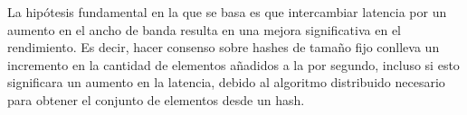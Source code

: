 La hipótesis fundamental en la que se basa \hashchain es que intercambiar latencia por un aumento en el
ancho de banda resulta en una mejora significativa en el rendimiento.
%
Es decir, hacer consenso sobre hashes de tamaño fijo conlleva un incremento en la cantidad de elementos
añadidos a la \setchain por segundo, incluso si esto significara un aumento en la latencia,
debido al algoritmo distribuido necesario para obtener el conjunto de elementos desde un hash.




